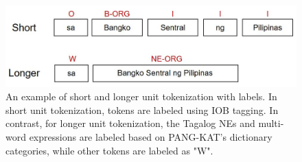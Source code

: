 \documentclass[journal]{./IEEE/IEEEtran}
\begin{document}
\begin{figure}[H]
    \centering
    \includegraphics[scale=0.43]{images/IOB Tagging and Labelling - Close Up.JPG}
    \captionsetup{justification=centering}
    \caption{An example of short and longer unit tokenization with labels. In short unit tokenization, tokens are labeled using IOB tagging. In contrast, for longer unit tokenization, the Tagalog NEs and multi-word expressions are labeled based on PANG-KAT's dictionary categories, while other tokens are labeled as "W".
}
\end{figure}
\end{document}
